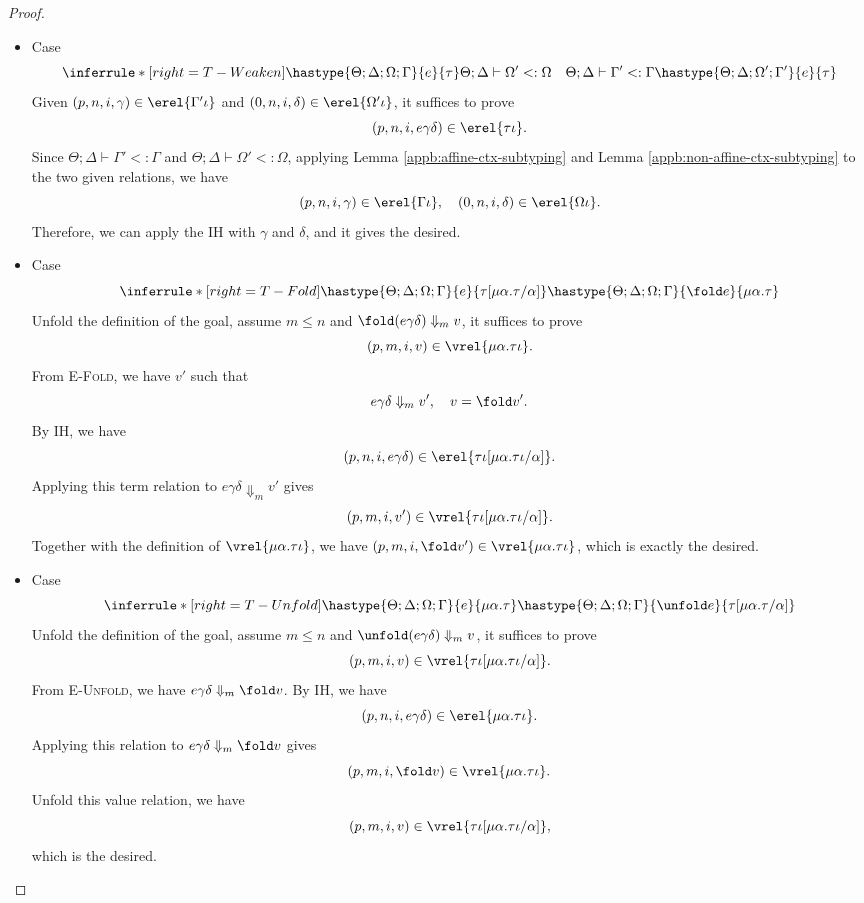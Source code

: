 \begin{proof}
\begin{itemize}
\item Case
\[
  \inferrule*[right=T-Weaken]
        {\hastype{\Theta;\Delta;\Omega;\Gamma}{e}{\tau}
         \\\\ \Theta;\Delta\vdash\Omega'<:\Omega
         \quad\Theta;\Delta\vdash\Gamma'<:\Gamma}
        {\hastype{\Theta;\Delta;\Omega';\Gamma'}{e}{\tau}}
\]
Given $(p, n, i, \gamma)\in\erel{\Gamma'\iota}$ and $(0, n, i, \delta)\in\erel{\Omega'\iota}$, it suffices to prove
\[(p, n, i, e\gamma\delta)\in\erel{\tau\iota}.\]
Since $\Theta;\Delta\vdash\Gamma'<:\Gamma$ and $\Theta;\Delta\vdash\Omega'<:\Omega$, applying
Lemma \ref{appb:affine-ctx-subtyping} and Lemma \ref{appb:non-affine-ctx-subtyping} to the two given relations, we have
\[(p, n, i, \gamma) \in \erel{\Gamma\iota}, \quad (0, n, i, \delta) \in \erel{\Omega\iota}.\]
Therefore, we can apply the IH with $\gamma$ and $\delta$, and it gives the desired.

\item Case
\[
  \inferrule*[right=T-Fold]
        {\hastype{\Theta;\Delta;\Omega;\Gamma}{e}{\tau[\mu\alpha.\tau/\alpha]}}
        {\hastype{\Theta;\Delta;\Omega;\Gamma}{\fold e}{\mu\alpha.\tau}}
\]
Unfold the definition of the goal, assume $m\leq n$ and
$\fold(e\gamma\delta)\Downarrow_m v$, it suffices to prove
\[(p, m, i, v)\in\vrel{\mu\alpha.\tau\iota}.\]
From \textsc{E-Fold}, we have $v'$ such that
\[
  e\gamma\delta\Downarrow_m v',
  \quad
  v=\fold v'.
\]
By IH, we have
\[(p, n, i, e\gamma\delta)\in\erel{\tau\iota[\mu\alpha.\tau\iota/\alpha]}.\]
Applying this term relation to $e\gamma\delta\Downarrow_m v'$ gives
\[(p, m, i, v')\in\vrel{\tau\iota[\mu\alpha.\tau\iota/\alpha]}.\]
Together with the definition of $\vrel{\mu\alpha.\tau\iota}$, we have
$(p, m, i, \fold v')\in\vrel{\mu\alpha.\tau\iota}$, which is exactly the desired.

\item Case
\[
  \inferrule*[right=T-Unfold]
        {\hastype{\Theta;\Delta;\Omega;\Gamma}{e}{\mu\alpha.\tau}}
        {\hastype{\Theta;\Delta;\Omega;\Gamma}{\unfold e}{\tau[\mu\alpha.\tau/\alpha]}}
\]
Unfold the definition of the goal, assume $m\leq n$ and
$\unfold(e\gamma\delta)\Downarrow_m v$, it suffices to prove
\[(p, m, i, v)\in\vrel{\tau\iota[\mu\alpha.\tau\iota/\alpha]}.\]
From \textsc{E-Unfold}, we have $e\gamma\delta\Downarrow_m\fold v$. By IH, we have
\[(p, n, i, e\gamma\delta)\in\erel{\mu\alpha.\tau\iota}.\]
Applying this relation to $e\gamma\delta\Downarrow_m\fold v$ gives
\[(p, m, i, \fold v)\in\vrel{\mu\alpha.\tau\iota}.\]
Unfold this value relation, we have
\[(p, m, i, v)\in\vrel{\tau\iota[\mu\alpha.\tau\iota/\alpha]},\]
which is the desired.


\end{itemize}
\end{proof}
